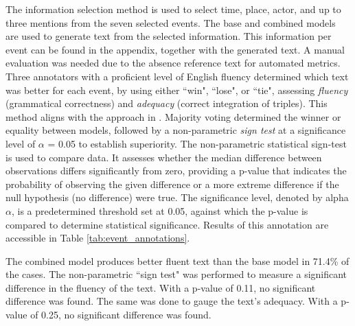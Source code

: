 \documentclass[
]{ceurart}
\begin{document}
The information selection method is used to select time, place, actor, and up to three mentions from the seven selected events. The base and combined models are used to generate text from the selected information. This information per event can be found in the appendix, together with the generated text. A manual evaluation was needed due to the absence reference text for automated metrics.
Three annotators with a proficient level of English fluency determined which text was better for each event, by using either ``win", ``lose", or ``tie", assessing \textit{fluency} (grammatical correctness) and \textit{adequacy} (correct integration of triples). This method aligns with the approach in \cite{JointGT}. Majority voting determined the winner or equality between models, followed by a non-parametric \textit{sign test} at a significance level of $\alpha$ = 0.05 to establish superiority. The non-parametric statistical sign-test is used to compare data. It assesses whether the median difference between observations differs significantly from zero, providing a p-value that indicates the probability of observing the given difference or a more extreme difference if the null hypothesis (no difference) were true. The significance level, denoted by alpha $\alpha$, is a predetermined threshold set at 0.05, against which the p-value is compared to determine statistical significance. Results of this annotation are accessible in Table \ref{tab:event_annotations}.

The combined model produces better fluent text than the base model in 71.4\% of the cases. The non-parametric ``sign test" was performed to measure a significant difference in the fluency of the text. With a p-value of 0.11, no significant difference was found. The same was done to gauge the text's adequacy. With a p-value of 0.25, no significant difference was found.
\end{document}
